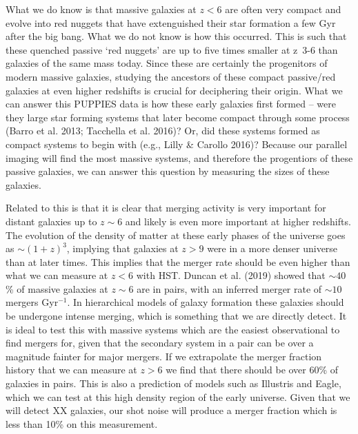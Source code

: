 \documentclass[12pt]{article}
\begin{document}
What we do know is that massive galaxies at $z < 6$ are often very compact and evolve into red nuggets that have extenguished their star formation a few Gyr after the big bang.  What we do not know is how this occurred.  This is such that these quenched passive ‘red nuggets’ are up to five times smaller at z~3-6 than galaxies of the same mass today.  Since these are certainly the progenitors of modern massive galaxies, studying the ancestors of these compact passive/red galaxies at even higher redshifts is crucial for deciphering their origin.   What we can answer this PUPPIES data is how these early galaxies first formed -- were they large star forming systems that later become compact through some process (Barro et al. 2013; Tacchella et al. 2016)? Or, did these systems formed as compact systems to begin with (e.g., Lilly & Carollo 2016)?   Because our parallel imaging will find the most massive systems, and therefore the progentiors of these passive galaxies, we can answer this question by measuring the sizes of these galaxies.

Related to this is that it is clear that merging activity is very important for distant galaxies up to $z \sim 6$ and likely is even more important at higher redshifts.  The evolution of the density of matter at these early phases of the universe goes as $\sim (1+z)^{3}$, implying that galaxies at $z > 9$ were in a more denser universe than at later times. This implies that the merger rate should be even higher than what we can measure at $z < 6$ with HST.  Duncan et al. (2019) showed that $\sim 40$\% of massive galaxies at $z \sim 6$ are in pairs, with an inferred merger rate of $\sim 10$ mergers Gyr$^{-1}$.  In hierarchical models of galaxy formation these galaxies should be undergone intense merging, which is something that we are directly detect. It is ideal to test this with massive systems which are the easiest observational to find mergers for, given that the secondary system in a pair can be over a magnitude fainter for major mergers.  If we extrapolate the merger fraction history that we can measure at $z > 6$ we find that there should be over 60\% of galaxies in pairs.  This is also a prediction of models such as Illustris and Eagle, which we can test at this high density region of the early universe.  Given that we will detect XX galaxies, our shot noise will produce a merger fraction which is less than 10\% on this measurement.  
\end{document}
